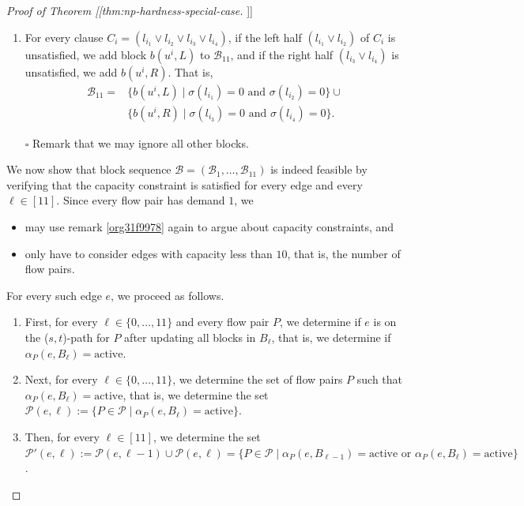 \documentclass[fontsize=11pt,paper=a4]{book}
\begin{document}
\begin{proof}[Proof of Theorem [[thm:np-hardness-special-case]]]
\begin{enumerate}
\item For every clause \(C_i=(l_{i_1}\vee l_{i_2}\vee l_{i_3}\vee l_{i_4})\), if the left half \((l_{i_1}\vee l_{i_2})\) of \(C_i\) is unsatisfied, we add block \(b(u^i,L)\) to \(\mathscr{B}_{11}\), and if the right half \((l_{i_3}\vee l_{i_4})\) is unsatisfied, we add \(b(u^i,R)\).
That is,
\begin{align*}
\mathscr{B}_{11}=&\{b(u^i,L)\mid\sigma(l_{i_1})=0\text{ and }\sigma(l_{i_2})=0\}\cup\\
&\{b(u^i,R)\mid\sigma(l_{i_3})=0\text{ and }\sigma(l_{i_4})=0\}.
\end{align*}
\end{enumerate}


\begin{itemize}
\item[{$\square$}] Remark that we may ignore all other blocks.
\end{itemize}


We now show that block sequence \(\mathcal{B}=(\mathscr{B}_1,\dots,\mathscr{B}_{11})\) is indeed feasible by verifying that the capacity constraint is satisfied for every edge and every \(\ell\in[11]\).
Since every flow pair has demand \(1\), we

\begin{itemize}
\item may use remark \ref{org31f9978} again to argue about capacity constraints, and

\item only have to consider edges with capacity less than \(10\), that is, the number of flow pairs.
\end{itemize}


For every such edge \(e\), we proceed as follows.

\begin{enumerate}
\item First, for every \(\ell\in\{0,\dots,11\}\) and every flow pair \(P\), we determine if \(e\) is on the (\(s,t\))-path for \(P\) after updating all blocks in \(B_{\ell}\), that is, we determine if \(\alpha_P(e,B_{\ell})=\mathrm{active}\).

\item Next, for every \(\ell\in\{0,\dots,11\}\), we determine the set of flow pairs \(P\) such that \(\alpha_P(e,B_{\ell})=\mathrm{active}\), that is, we determine the set \(\mathcal{P}(e,\ell):=\{P\in\mathcal{P}\mid\alpha_P(e,B_{\ell})=\mathrm{active}\}\).

\item Then, for every \(\ell\in[11]\), we determine the set \(\mathcal{P}'(e,\ell):=\mathcal{P}(e,\ell-1)\cup\mathcal{P}(e,\ell)=\{P\in\mathcal{P}\mid\alpha_P(e,B_{\ell-1})=\mathrm{active}\text{ or }\alpha_P(e,B_{\ell})=\mathrm{active}\}\).


\end{enumerate}
\end{proof}
\end{document}
